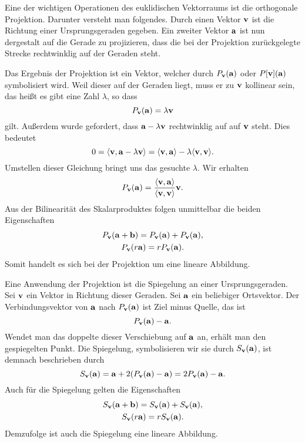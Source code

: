 Eine der wichtigen Operationen des euklidischen Vektorraums ist
die orthogonale Projektion. Darunter versteht man folgendes.
Durch einen Vektor $\mathbf{v}$ ist die Richtung einer Ursprungsgeraden
gegeben. Ein zweiter Vektor $\mathbf{a}$ ist nun dergestalt auf die
Gerade zu projizieren, dass die bei der Projektion zurückgelegte
Strecke rechtwinklig auf der Geraden steht.

Das Ergebnis der Projektion ist ein Vektor, welcher durch
$P_{\mathbf{v}}(\mathbf{a})$ oder $P[\mathbf{v}](\mathbf{a})$ symbolisiert wird.
Weil dieser auf der Geraden liegt, muss er zu $\mathbf{v}$ kollinear
sein, das heißt es gibt eine Zahl $\lambda$, so dass
\[P_{\mathbf{v}}(\mathbf{a}) = \lambda\mathbf{v}\]
gilt. Außerdem wurde gefordert, dass $\mathbf{a}-\lambda\mathbf{v}$
rechtwinklig auf auf $\mathbf{v}$ steht. Dies bedeutet
\[0 = \langle\mathbf{v},\mathbf{a}-\lambda\mathbf{v}\rangle
= \langle\mathbf{v},\mathbf{a}\rangle - \lambda\langle\mathbf{v},\mathbf{v}\rangle.\]
Umstellen dieser Gleichung bringt uns das gesuchte $\lambda$. Wir
erhalten
\[P_{\mathbf{v}}(\mathbf{a}) = \frac{\langle\mathbf{v},\mathbf{a}\rangle}
{\langle\mathbf{v},\mathbf{v}\rangle}\mathbf{v}.\]
Aus der Bilinearität des Skalarproduktes folgen unmittelbar
die beiden Eigenschaften
\begin{gather*}
P_{\mathbf{v}}(\mathbf{a}+\mathbf{b}) = P_{\mathbf{v}}(\mathbf{a})+P_{\mathbf{v}}(\mathbf{a}),\\
P_{\mathbf{v}}(r\mathbf{a}) = rP_{\mathbf{v}}(\mathbf{a}).
\end{gather*}
Somit handelt es sich bei der Projektion um eine lineare
Abbildung.

Eine Anwendung der Projektion ist die Spiegelung an einer
Ursprungsgeraden. Sei $\mathbf{v}$ ein Vektor in Richtung dieser
Geraden. Sei $\mathbf{a}$ ein beliebiger Ortsvektor.
Der Verbindungsvektor von $\mathbf{a}$ nach $P_{\mathbf{v}}(\mathbf{a})$
ist Ziel minus Quelle, das ist
\[P_{\mathbf{v}}(\mathbf{a}) - \mathbf{a}.\]
Wendet man das doppelte dieser Verschiebung auf $\mathbf{a}$ an,
erhält man den gespiegelten Punkt. Die Spiegelung, symbolisieren
wir sie durch $S_{\mathbf{v}}(\mathbf{a})$, ist demnach
beschrieben durch
\[S_{\mathbf{v}}(\mathbf{a}) = \mathbf{a} + 2(P_{\mathbf{v}}(\mathbf{a}) - \mathbf{a})
= 2P_{\mathbf{v}}(\mathbf{a}) - \mathbf{a}.\]
Auch für die Spiegelung gelten die Eigenschaften
\begin{gather*}
S_{\mathbf{v}}(\mathbf{a}+\mathbf{b}) = S_{\mathbf{v}}(\mathbf{a})+S_{\mathbf{v}}(\mathbf{a}),\\
S_{\mathbf{v}}(r\mathbf{a}) = rS_{\mathbf{v}}(\mathbf{a}).
\end{gather*}
Demzufolge ist auch die Spiegelung eine lineare Abbildung.

